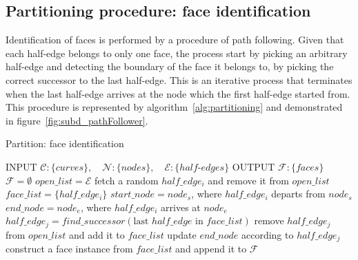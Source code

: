 \subsection{Partitioning procedure: face identification}
Identification of faces is performed by a procedure of path following.
Given that each half-edge belongs to only one face, the process start by picking an arbitrary half-edge and detecting the boundary of the face it belongs to, by picking the correct successor to the last half-edge.
This is an iterative process that terminates when the last half-edge arrives at the node which the first half-edge started from.
This procedure is represented by algorithm~\ref{alg:partitioning} and demonstrated in figure~\ref{fig:subd_pathFollower}.

\begin{algorithm}
  \caption {Partition: face identification}
  \label{alg:partitioning}
  \begin{algorithmic}
    \STATE INPUT  $\mathcal{C}:\{curves\}, \quad \mathcal{N}:\{nodes\}, \quad \mathcal{E}:\{half\text{-}edges\}$
    \STATE OUTPUT  $\mathcal{F}:\{faces\}$
    \STATE \quad
    \STATE $\mathcal{F} = \emptyset$
    \STATE $open\_list = \mathcal{E}$
    \STATE fetch a random $half\_edge_i$ and remove it from $open\_list$
    \STATE $face\_list = \{ half\_edge_i\}$
    \STATE $start\_node = node_s$, where $half\_edge_i$ departs from $node_s$
    \STATE $end\_node = node_e$, where $half\_edge_i$ arrives at $node_e$
    \STATE $half\_edge_j= \mathit{find\_successor} \left( \text{last } half\_edge \text{ in } face\_list \right)$
    \STATE remove $half\_edge_j$ from $open\_list$ and add it to $face\_list$
    \STATE update $end\_node$ according to $half\_edge_j$
    \ENDWHILE
    \STATE construct a face instance from $face\_list$ and append it to $\mathcal{F}$
    \ENDWHILE
  \end{algorithmic}
\end{algorithm}

